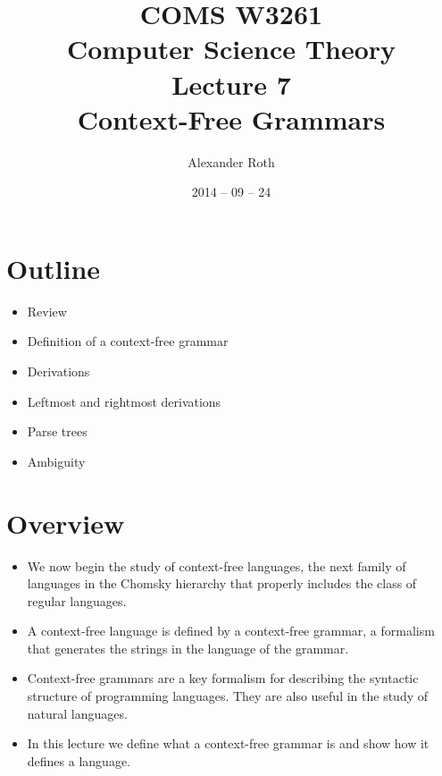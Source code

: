 \documentclass[]{article}
\begin{document}
\newcommand*{\xml}[1]{\texttt{<#1>}}

\title{COMS W3261 \\ Computer Science Theory \\ Lecture 7\\ Context-Free 
Grammars}
\author{Alexander Roth}
\date{2014 -- 09 -- 24}
\maketitle

\section*{Outline}
  \begin{itemize}
    \item Review
    \item Definition of a context-free grammar
    \item Derivations
    \item Leftmost and rightmost derivations
    \item Parse trees
    \item Ambiguity
  \end{itemize}
  
\section{Overview}
  \begin{itemize}
    \item We now begin the study of context-free languages, the next family of
    languages in the Chomsky hierarchy that properly includes the class of
    regular languages.
    \item A context-free language is defined by a context-free grammar, a
    formalism that generates the strings in the language of the grammar.
    \item Context-free grammars are a key formalism for describing the syntactic
    structure of programming languages. They are also useful in the study of
    natural languages.
    \item In this lecture we define what a context-free grammar is and show how
    it defines a language.
  \end{itemize}
  
\end{document}
